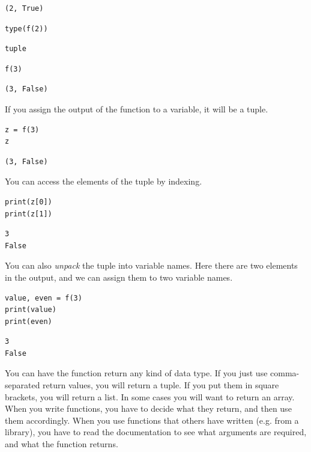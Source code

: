 \documentclass[11pt]{article}
\begin{document}
\begin{verbatim}
(2, True)
\end{verbatim}

\begin{verbatim}
type(f(2))
\end{verbatim}

\begin{verbatim}
tuple
\end{verbatim}


\begin{verbatim}
f(3)
\end{verbatim}

\begin{verbatim}
(3, False)
\end{verbatim}

If you assign the output of the function to a variable, it will be a tuple.

\begin{verbatim}
z = f(3)
z
\end{verbatim}

\begin{verbatim}
(3, False)
\end{verbatim}

You can access the elements of the tuple by indexing.

\begin{verbatim}
print(z[0])
print(z[1])
\end{verbatim}

\begin{verbatim}
3
False

\end{verbatim}

You can also \emph{unpack} the tuple into variable names. Here there are two elements in the output, and we can assign them to two variable names.

\begin{verbatim}
value, even = f(3)
print(value)
print(even)
\end{verbatim}

\begin{verbatim}
3
False

\end{verbatim}

You can have the function return any kind of data type. If you just use comma-separated return values, you will return a tuple. If you put them in square brackets, you will return a list. In some cases you will want to return an array. When you write functions, you have to decide what they return, and then use them accordingly. When you use functions that others have written (e.g. from a library), you have to read the documentation to see what arguments are required, and what the function returns.
\end{document}
